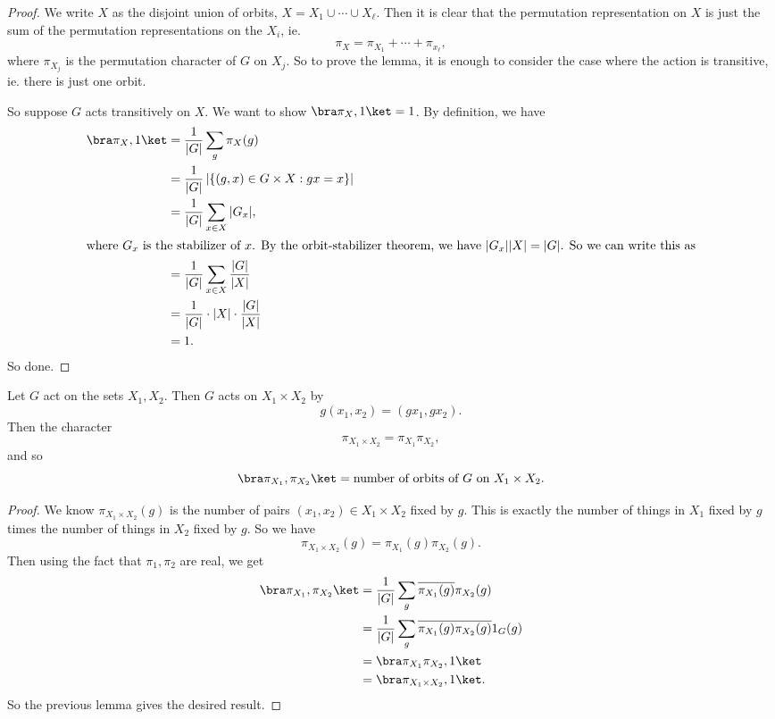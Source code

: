 \documentclass[a4paper]{article}
\begin{document}
\begin{proof}
  We write $X$ as the disjoint union of orbits, $X = X_1 \cup \cdots \cup X_\ell$. Then it is clear that the permutation representation on $X$ is just the sum of the permutation representations on the $X_i$, ie.
  \[
    \pi_X = \pi_{X_1} + \cdots + \pi_{x_\ell},
  \]
  where $\pi_{X_j}$ is the permutation character of $G$ on $X_j$. So to prove the lemma, it is enough to consider the case where the action is transitive, ie. there is just one orbit.

  So suppose $G$ acts transitively on $X$. We want to show $\bra \pi_X, 1\ket = 1$. By definition, we have
  \begin{align*}
    \bra \pi_X, 1 \ket &= \frac{1}{|G|} \sum_g \pi_X(g) \\
    &= \frac{1}{|G|} \left|\{(g, x) \in G\times X: gx = x\}\right|\\
    &= \frac{1}{|G|} \sum_{x \in X} |G_x|,\\
    \intertext{where $G_x$ is the stabilizer of $x$. By the orbit-stabilizer theorem, we have $|G_x||X| = |G|$. So we can write this as}
    &= \frac{1}{|G|} \sum_{x \in X} \frac{|G|}{|X|}\\
    &= \frac{1}{|G|} \cdot |X| \cdot \frac{|G|}{|X|}\\
    &= 1.
  \end{align*}
  So done.
\end{proof}

\begin{lemma}
  Let $G$ act on the sets $X_1, X_2$. Then $G$ acts on $X_1 \times X_2$ by
  \[
    g(x_1, x_2) = (g x_1, g x_2).
  \]
  Then the character
  \[
    \pi_{X_1 \times X_2} = \pi_{X_1}\pi_{X_2},
  \]
  and so
  \[
    \bra \pi_{X_1}, \pi_{X_2}\ket = \text{number of orbits of }G\text{ on }X_1 \times X_2.
  \]
\end{lemma}

\begin{proof}
  We know $\pi_{X_1 \times X_2}(g)$ is the number of pairs $(x_1, x_2) \in X_1 \times X_2$ fixed by $g$. This is exactly the number of things in $X_1$ fixed by $g$ times the number of things in $X_2$ fixed by $g$. So we have
  \[
    \pi_{X_1 \times X_2}(g) = \pi_{X_1}(g) \pi_{X_2}(g).
  \]
  Then using the fact that $\pi_1, \pi_2$ are real, we get
  \begin{align*}
    \bra \pi_{X_1}, \pi_{X_2}\ket &= \frac{1}{|G|} \sum_g \overline{\pi_{X_1}(g)}\pi_{X_2}(g)\\
    &= \frac{1}{|G|} \sum_g \overline{\pi_{X_1}(g) \pi_{X_2}(g)} 1_G(g)\\
    &= \bra \pi_{X_1}\pi_{X_2}, 1\ket \\
    &= \bra \pi_{X_1\times X_2}, 1\ket.
  \end{align*}
  So the previous lemma gives the desired result.
\end{proof}
\end{document}
